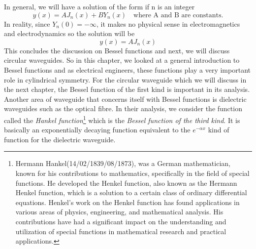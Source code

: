 In general, we will have a solution of the form if n is an integer
\begin{equation*}
y(x) = AJ_n(x) + B Y_n(x)\quad\text{where A and B are constants.}
\end{equation*}
In reality, since $Y_n(0) = -\infty$, it makes no physical sense in electromagnetics and electrodynamics so the solution will be 
\begin{equation}
y(x) = AJ_n(x)
\end{equation}
This concludes the discussion on Bessel functions and next, we will discuss circular waveguides. So in this chapter, we looked at a general introduction to Bessel functions and as electrical engineers, these functions play a very important role in cylindrical symmetry. For the circular waveguide which we will discuss in the next chapter, the Bessel function of the first kind is important in its analysis. Another area of waveguide that concerns itself with Bessel functions is dielectric waveguides such as the optical fibre. In their analysis, we consider the function called the \emph{Hankel function}\footnote{
Hermann Hankel(14/02/1839/08/1873), was a German mathematician, known for his contributions to mathematics, specifically in the field of special functions. He developed the Henkel function, also known as the Hermann Henkel function, which is a solution to a certain class of ordinary differential equations. Henkel's work on the Henkel function has found applications in various areas of physics, engineering, and mathematical analysis. His contributions have had a significant impact on the understanding and utilization of special functions in mathematical research and practical applications.
} which is the \emph{Bessel function of the third kind}. It is basically an exponentially decaying function equivalent to the $e^{-\alpha x}$ kind of function for the dielectric waveguide.
